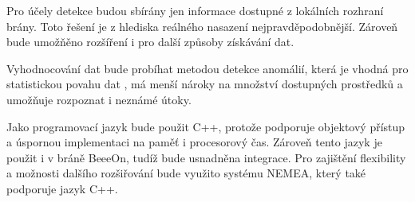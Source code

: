  Pro účely detekce budou sbírány jen informace dostupné z lokálních rozhraní brány. Toto řešení
 je z hlediska reálného nasazení nejpravděpodobnější. Zároveň bude umožňěno rozšíření i pro další
 způsoby získávání dat. 
 
 Vyhodnocování dat bude probíhat metodou detekce anomálií, která je vhodná pro statistickou povahu dat
 , má menší nároky na množství dostupných prostředků a umožňuje rozpoznat i neznámé útoky.
 
 Jako programovací jazyk bude použit C++, protože podporuje objektový přístup a
 úspornou implementaci na paměť i procesorový čas. Zároveň tento jazyk je použit i v bráně
 BeeeOn, tudíž bude usnadněna integrace. Pro zajištění flexibility a možnosti dalšího rozšiřování 
 bude využito systému NEMEA, který také podporuje jazyk C++. 
 

